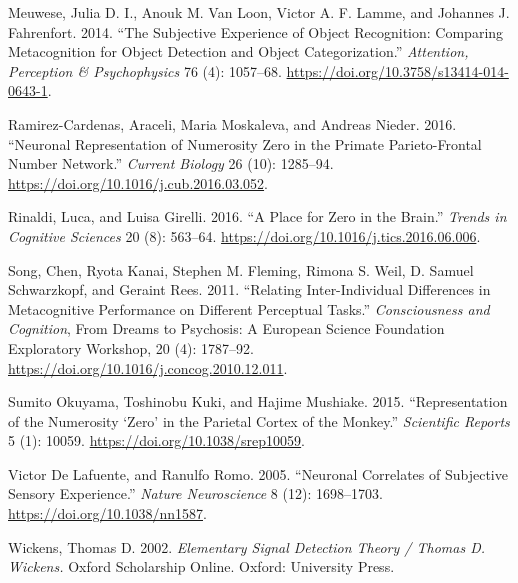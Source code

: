 \documentclass[
]{article}
\begin{document}
\leavevmode\hypertarget{ref-meuwese2014app}{}%
Meuwese, Julia D. I., Anouk M. Van Loon, Victor A. F. Lamme, and
Johannes J. Fahrenfort. 2014. ``The Subjective Experience of Object
Recognition: Comparing Metacognition for Object Detection and Object
Categorization.'' \emph{Attention, Perception \& Psychophysics} 76 (4):
1057--68. \url{https://doi.org/10.3758/s13414-014-0643-1}.

\leavevmode\hypertarget{ref-ramirez-cardenas2016cb}{}%
Ramirez-Cardenas, Araceli, Maria Moskaleva, and Andreas Nieder. 2016.
``Neuronal Representation of Numerosity Zero in the Primate
Parieto-Frontal Number Network.'' \emph{Current Biology} 26 (10):
1285--94. \url{https://doi.org/10.1016/j.cub.2016.03.052}.

\leavevmode\hypertarget{ref-rinaldi2016tics}{}%
Rinaldi, Luca, and Luisa Girelli. 2016. ``A Place for Zero in the
Brain.'' \emph{Trends in Cognitive Sciences} 20 (8): 563--64.
\url{https://doi.org/10.1016/j.tics.2016.06.006}.

\leavevmode\hypertarget{ref-song2011cac}{}%
Song, Chen, Ryota Kanai, Stephen M. Fleming, Rimona S. Weil, D. Samuel
Schwarzkopf, and Geraint Rees. 2011. ``Relating Inter-Individual
Differences in Metacognitive Performance on Different Perceptual
Tasks.'' \emph{Consciousness and Cognition}, From Dreams to Psychosis: A
European Science Foundation Exploratory Workshop, 20 (4): 1787--92.
\url{https://doi.org/10.1016/j.concog.2010.12.011}.

\leavevmode\hypertarget{ref-sumitookuyama2015sr}{}%
Sumito Okuyama, Toshinobu Kuki, and Hajime Mushiake. 2015.
``Representation of the Numerosity `Zero' in the Parietal Cortex of the
Monkey.'' \emph{Scientific Reports} 5 (1): 10059.
\url{https://doi.org/10.1038/srep10059}.

\leavevmode\hypertarget{ref-victordelafuente2005nn}{}%
Victor De Lafuente, and Ranulfo Romo. 2005. ``Neuronal Correlates of
Subjective Sensory Experience.'' \emph{Nature Neuroscience} 8 (12):
1698--1703. \url{https://doi.org/10.1038/nn1587}.

\leavevmode\hypertarget{ref-wickens2002}{}%
Wickens, Thomas D. 2002. \emph{Elementary Signal Detection Theory /
Thomas D. Wickens.} Oxford Scholarship Online. Oxford: University Press.
\end{document}
